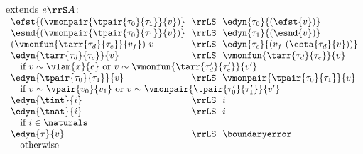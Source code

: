 \begin{flushleft}
\begin{minipage}[t]{\columnwidth}
 extends $e \rrS A$:\\
$\begin{array}{l@{~~}c@{~~}l}
  \efst{(\vmonpair{\tpair{\tau_0}{\tau_1}}{v})} & \rrLS & \edyn{\tau_0}{(\efst{v})}
\\
  \esnd{(\vmonpair{\tpair{\tau_0}{\tau_1}}{v})} & \rrLS & \edyn{\tau_1}{(\esnd{v})}
\\
  (\vmonfun{\tarr{\tau_d}{\tau_c}}{v_f})~v & \rrLS & \edyn{\tau_c}{(v_f~(\esta{\tau_d}{v}))}
\\
  \edyn{\tarr{\tau_d}{\tau_c}}{v} & \rrLS & \vmonfun{\tarr{\tau_d}{\tau_c}}{v}
\\ \multicolumn{3}{l}{\mbox{\quad if $v \sim \vlam{x}{e}$ or $v \sim \vmonfun{\tarr{\tau_d'}{\tau_c'}}{v'}$}}
\\
  \edyn{\tpair{\tau_0}{\tau_1}}{v} & \rrLS & \vmonpair{\tpair{\tau_0}{\tau_1}}{v}
\\ \multicolumn{3}{l}{\mbox{\quad if $v \sim \vpair{v_0}{v_1}$ or $v \sim \vmonpair{\tpair{\tau_0'}{\tau_1'}}{v'}$}}
\\
  \edyn{\tint}{i} & \rrLS & i
\\
  \edyn{\tnat}{i} & \rrLS & i
\\ \multicolumn{3}{l}{\mbox{\quad if $i \in \naturals$}}
\\
  \edyn{\tau}{v} & \rrLS & \boundaryerror
\\ \multicolumn{3}{l}{\mbox{\quad otherwise}}
\end{array}$
\end{minipage}

\end{flushleft}
